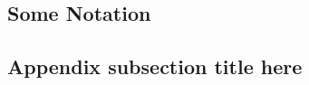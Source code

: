 \documentclass[a4paper]{article}
\begin{document}
\renewcommand\theequation{\Alph{section}\arabic{equation}} %
\renewcommand\thefigure{\Alph{section}\arabic{figure}} %
\renewcommand\thetable{\Alph{section}\arabic{table}} %

\begin{appendices}

\section{Some Notation}
\lipsum[10]

\subsection{Appendix subsection title here}
\lipsum[14]

\end{appendices}
\end{document}
